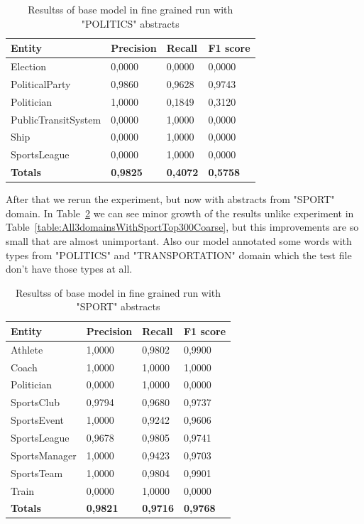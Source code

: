 \documentclass[thesis=M,english]{FITthesis}[2018/05/30]
\begin{document}
	\begin{table}[H]\centering
		\begin{tabular}{|l|l|l|l|}
			\hline {\textbf{Entity}} & {\textbf{Precision}} & {\textbf{Recall}} & {\textbf{F1 score}}\\\hline
				Election & 0,0000 & 0,0000 & 0,0000\\
				PoliticalParty & 0,9860 & 0,9628 & 0,9743\\
				Politician & 1,0000 & 0,1849 & 0,3120\\
				PublicTransitSystem & 0,0000 & 1,0000 & 0,0000\\
				Ship & 0,0000 & 1,0000 & 0,0000\\
				SportsLeague & 0,0000 & 1,0000 & 0,0000\\\hline
				\textbf{Totals} & \textbf{0,9825} & \textbf{0,4072} & \textbf{0,5758}\\\hline
		\end{tabular}
		\caption{Resultss of base model in fine grained run with "POLITICS" abstracts\label{table:All3domainsWithPoliticsTop300Fine}}
	\end{table}	

    After that we rerun the experiment, but now with abstracts from "SPORT" domain. In Table~\ref{table:All3domainsWithSportTop300Fine} we can see minor growth of the results unlike experiment in Table~\ref{table:All3domainsWithSportTop300Coarse}, but this improvements are so small that are almost unimportant. Also our model annotated some words with types from "POLITICS" and "TRANSPORTATION" domain which the test file don't have those types at all.
    
	\begin{table}[H]\centering
		\begin{tabular}{|l|l|l|l|}
			\hline {\textbf{Entity}} & {\textbf{Precision}} & {\textbf{Recall}} & {\textbf{F1 score}}\\\hline
				Athlete & 1,0000 & 0,9802 & 0,9900\\
				Coach & 1,0000 & 1,0000 & 1,0000\\
				Politician & 0,0000 & 1,0000 & 0,0000\\
				SportsClub & 0,9794 & 0,9680 & 0,9737\\
				SportsEvent & 1,0000 & 0,9242 & 0,9606\\
				SportsLeague & 0,9678 & 0,9805 & 0,9741\\
				SportsManager & 1,0000 & 0,9423 & 0,9703\\				
				SportsTeam & 1,0000 & 0,9804 & 0,9901\\
				Train & 0,0000 & 1,0000 & 0,0000\\\hline
				\textbf{Totals} & \textbf{0,9821} & \textbf{0,9716} & \textbf{0,9768}\\\hline
		\end{tabular}
		\caption{Resultss of base model in fine grained run with "SPORT" abstracts \label{table:All3domainsWithSportTop300Fine}}
	\end{table}
	
\end{document}

